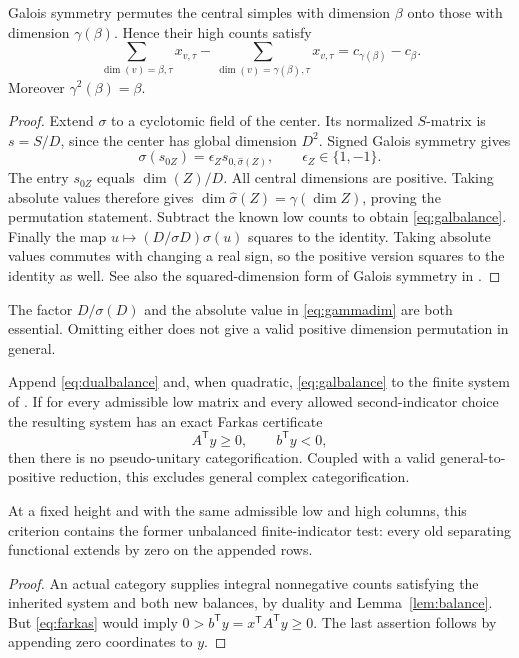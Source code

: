 \begin{lemma}\label{lem:balance}
Galois symmetry permutes the central simples with dimension
$\beta$ onto those with dimension $\gamma(\beta)$. Hence their high
counts satisfy
\begin{equation}\label{eq:galbalance}
 \sum_{\dim(v)=\beta,\tau}x_{v,\tau}
 -\sum_{\dim(v)=\gamma(\beta),\tau}x_{v,\tau}
 =c_{\gamma(\beta)}-c_\beta.
\end{equation}
Moreover $\gamma^2(\beta)=\beta$.
\end{lemma}
\begin{proof}
Extend $\sigma$ to a cyclotomic field of the center. Its normalized
$S$-matrix is $s=S/D$, since the center has global dimension $D^2$.
Signed Galois symmetry gives
\[
 \sigma(s_{0Z})=\epsilon_Zs_{0,\widehat\sigma(Z)},
 \qquad\epsilon_Z\in\{1,-1\}.
\]
The entry $s_{0Z}$ equals $\dim(Z)/D$. All central dimensions are
positive. Taking absolute values therefore gives
$\dim\widehat\sigma(Z)=\gamma(\dim Z)$, proving the permutation
statement. Subtract the known low counts to obtain
\eqref{eq:galbalance}. Finally the map
$u\mapsto (D/\sigma D)\sigma(u)$ squares to the identity. Taking
absolute values commutes with changing a real sign, so the positive
version squares to the identity as well. See also the squared-dimension
form of Galois symmetry in \cite[Equation~(2.4)]{MY}.
\end{proof}

The factor $D/\sigma(D)$ and the absolute value in
\eqref{eq:gammadim} are both essential. Omitting either does not give a
valid positive dimension permutation in general.

\begin{theorem}\label{thm:balanced}
Append \eqref{eq:dualbalance} and, when quadratic,
\eqref{eq:galbalance} to the finite system of \cite{DP5}.
If for every admissible low matrix and every allowed second-indicator
choice the resulting system has an exact Farkas certificate
\begin{equation}\label{eq:farkas}
 A^{\mathsf T}y\ge0,\qquad b^{\mathsf T}y<0,
\end{equation}
then there is no pseudo-unitary categorification. Coupled with a valid
general-to-positive reduction, this excludes general complex
categorification.

At a fixed height and with the same admissible low and high columns,
this criterion contains the former unbalanced finite-indicator test:
every old separating functional extends by zero on the appended rows.
\end{theorem}
\begin{proof}
An actual category supplies integral nonnegative counts satisfying the
inherited system and both new balances, by duality and
Lemma~\ref{lem:balance}. But \eqref{eq:farkas} would imply
$0>b^{\mathsf T}y=x^{\mathsf T}A^{\mathsf T}y\ge0$.
The last assertion follows by appending zero coordinates to $y$.
\end{proof}

